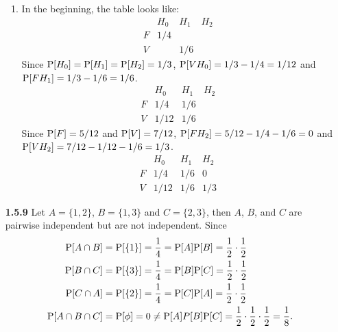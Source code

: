 \documentclass{article}
\begin{document}
\begin{enumerate}
\begin{enumerate}[label=(\alph*)]
        \item In the beginning, the table looks like:
        $$
        \begin{array}{c|ccc}
            & H_0   & H_1   & H_2 \\
        \hline
        F   & 1 / 4 &       & \\
        V   &       & 1 / 6 &
        \end{array}
        $$
        Since $\mbox P[H_0] = \mbox P[H_1] = \mbox P[H_2] = 1 / 3$, $\mbox P[VH_0] = 1 / 3 - 1 / 4 = 1 / 12$ and $\mbox P[FH_1] = 1 / 3 - 1 / 6 = 1 / 6$.
        $$
        \begin{array}{c|ccc}
            & H_0    & H_1   & H_2 \\
        \hline
        F   & 1 / 4  & 1 / 6 & \\
        V   & 1 / 12 & 1 / 6 &
        \end{array}
        $$
        Since $\mbox P[F] = 5 / 12$ and $\mbox P[V] = 7 / 12$, $\mbox P[FH_2] = 5 / 12 - 1 / 4 - 1 / 6 = 0$ and $\mbox P[VH_2] = 7 / 12 - 1 / 12 - 1 / 6 = 1 / 3$.
        $$
        \begin{array}{c|ccc}
            & H_0    & H_1   & H_2 \\
        \hline
        F   & 1 / 4  & 1 / 6 & 0 \\
        V   & 1 / 12 & 1 / 6 & 1 / 3
        \end{array}
        $$
    \end{enumerate}

    \item [\textbf{1.5.9}]
    Let $A = \{1, 2\}$, $B = \{1, 3\}$ and $C = \{2, 3\}$, then $A$, $B$, and $C$ are pairwise independent but are not independent. Since
    \begin{align*}
    \mbox P[A \cap B] & = \mbox P[\{1\}] = \frac{1}{4} = \mbox P[A] \mbox P[B] = \frac{1}{2} \cdot \frac{1}{2} \\
    \mbox P[B \cap C] & = \mbox P[\{3\}] = \frac{1}{4} = \mbox P[B] \mbox P[C] = \frac{1}{2} \cdot \frac{1}{2} \\
    \mbox P[C \cap A] & = \mbox P[\{2\}] = \frac{1}{4} = \mbox P[C] \mbox P[A] = \frac{1}{2} \cdot \frac{1}{2} \\
    \mbox P[A \cap B \cap C] & = \mbox P[\phi] = 0 \ne \mbox P[A] P[B] \mbox P[C] = \frac{1}{2} \cdot \frac{1}{2} \cdot \frac{1}{2} = \frac{1}{8}.
    \end{align*}
\end{enumerate}
\end{document}
